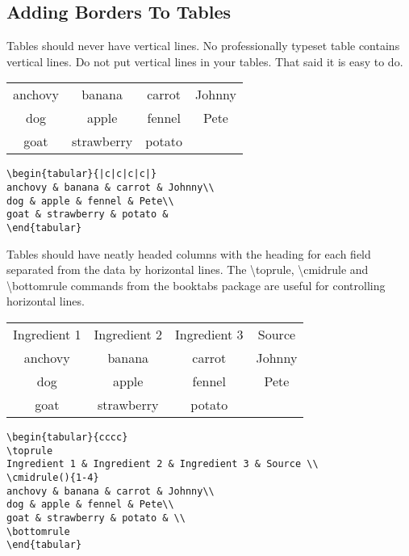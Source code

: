 \subsection{Adding Borders To Tables}
\label{sec:vertLines}
Tables should never have vertical lines. No professionally typeset table contains vertical lines. Do not put vertical lines in your tables. That said it is easy to do.

\begin{center}
\begin{tabular}{|c|c|c|c|}
anchovy & banana & carrot & Johnny\\
dog & apple & fennel & Pete\\
goat & strawberry & potato &
\end{tabular}

\vspace*{2ex}

\begin{verbatim}
\begin{tabular}{|c|c|c|c|}
anchovy & banana & carrot & Johnny\\
dog & apple & fennel & Pete\\
goat & strawberry & potato &
\end{tabular}
\end{verbatim}
\end{center}

\vspace*{2ex}

Tables should have neatly headed columns with the heading for each field separated from the data by horizontal lines. The {\textbackslash}toprule, {\textbackslash}cmidrule{} and {\textbackslash}bottomrule commands from the booktabs package are useful for controlling horizontal lines.

\begin{center}
\begin{tabular}{cccc}
\toprule
Ingredient 1 & Ingredient 2 & Ingredient 3 & Source \\
\cmidrule(){1-4}
anchovy & banana & carrot & Johnny\\
dog & apple & fennel & Pete\\
goat & strawberry & potato & \\
\bottomrule
\end{tabular}

\vspace*{2ex}

\begin{verbatim}
\begin{tabular}{cccc}
\toprule
Ingredient 1 & Ingredient 2 & Ingredient 3 & Source \\
\cmidrule(){1-4}
anchovy & banana & carrot & Johnny\\
dog & apple & fennel & Pete\\
goat & strawberry & potato & \\
\bottomrule
\end{tabular}
\end{verbatim}
\end{center}

